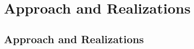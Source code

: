 \documentclass{beamer}
\begin{document}

\section[Realization]{Approach and Realizations}

\subsection{Approach and Realizations}

\end{document}
